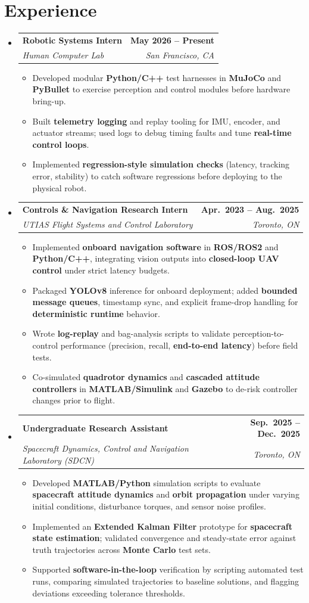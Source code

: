 \documentclass[letterpaper,11pt]{article}
\makeatletter
\newcommand{\resumeSubheading}[4]{
  \item
  \begin{tabular*}{1.0\textwidth}[t]{l@{\extracolsep{\fill}}r}
    \textbf{#1} & \textbf{\small #2} \\
    \textit{\small #3} & \textit{\small #4}
  \end{tabular*}\vspace{-6pt}
}
\newcommand{\resumeItem}[1]{\item \small{#1}}
\newcommand{\resumeItemListStart}{\begin{itemize}[leftmargin=0.15in, itemsep=-2pt]}
\newcommand{\resumeItemListEnd}{\end{itemize}\vspace{-6pt}}
\makeatother
\begin{document}
\section{Experience}
\begin{itemize}[leftmargin=0in, label={}]

\resumeSubheading
{Robotic Systems Intern}{May 2026 -- Present}
{Human Computer Lab}{San Francisco, CA}
\resumeItemListStart
  \resumeItem{Developed modular \textbf{Python/C++} test harnesses in \textbf{MuJoCo} and \textbf{PyBullet} to exercise perception and control modules before hardware bring-up.}
  \resumeItem{Built \textbf{telemetry logging} and replay tooling for IMU, encoder, and actuator streams; used logs to debug timing faults and tune \textbf{real-time control loops}.}
  \resumeItem{Implemented \textbf{regression-style simulation checks} (latency, tracking error, stability) to catch software regressions before deploying to the physical robot.}
\resumeItemListEnd

\resumeSubheading
{Controls \& Navigation Research Intern}{Apr.\ 2023 -- Aug.\ 2025}
{UTIAS Flight Systems and Control Laboratory}{Toronto, ON}
\resumeItemListStart
  \resumeItem{Implemented \textbf{onboard navigation software} in \textbf{ROS/ROS2} and \textbf{Python/C++}, integrating vision outputs into \textbf{closed-loop UAV control} under strict latency budgets.}
  \resumeItem{Packaged \textbf{YOLOv8} inference for onboard deployment; added \textbf{bounded message queues}, timestamp sync, and explicit frame-drop handling for \textbf{deterministic runtime} behavior.}
  \resumeItem{Wrote \textbf{log-replay} and bag-analysis scripts to validate perception-to-control performance (precision, recall, \textbf{end-to-end latency}) before field tests.}
  \resumeItem{Co-simulated \textbf{quadrotor dynamics} and \textbf{cascaded attitude controllers} in \textbf{MATLAB/Simulink} and \textbf{Gazebo} to de-risk controller changes prior to flight.}
\resumeItemListEnd

\resumeSubheading
{Undergraduate Research Assistant}{Sep.\ 2025 -- Dec.\ 2025}
{Spacecraft Dynamics, Control and Navigation Laboratory (SDCN)}{Toronto, ON}
\resumeItemListStart
  \resumeItem{Developed \textbf{MATLAB/Python} simulation scripts to evaluate \textbf{spacecraft attitude dynamics} and \textbf{orbit propagation} under varying initial conditions, disturbance torques, and sensor noise profiles.}
  \resumeItem{Implemented an \textbf{Extended Kalman Filter} prototype for \textbf{spacecraft state estimation}; validated convergence and steady-state error against truth trajectories across \textbf{Monte Carlo} test sets.}
  \resumeItem{Supported \textbf{software-in-the-loop} verification by scripting automated test runs, comparing simulated trajectories to baseline solutions, and flagging deviations exceeding tolerance thresholds.}
\resumeItemListEnd


\end{itemize}
\end{document}
